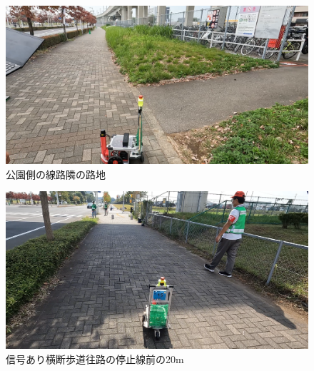 \documentclass[twocolumn,9pt]{jsproceedings}
\begin{document}
\begin{figure}[h]
  \begin{center}
    \includegraphics[width=1.0\linewidth]{figs/park_side_alley.pdf}
    \caption{公園側の線路隣の路地}
    \label{fig:park_side_alley}
  \end{center}
\end{figure}

\begin{figure}[h]
  \begin{center}
    \includegraphics[width=1.0\linewidth]{figs/20m_before_stop_line.pdf}
    \caption{信号あり横断歩道往路の停止線前の20m}
    \label{fig:20m_before_stop_line}
  \end{center}
\end{figure}
\end{document}
